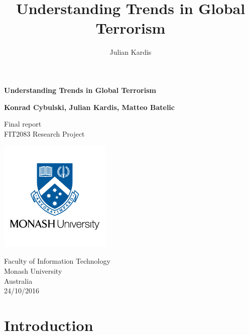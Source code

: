 \documentclass[10pt,a4paper]{article}
\author{Julian Kardis}
\title{Understanding Trends in Global Terrorism}
\begin{document}
\begin{titlepage}
    \begin{center}
        \vspace*{1cm}
        
        \LARGE
        \textbf{Understanding Trends in Global Terrorism}
        
        \vspace{4cm}
        
		\Large 
        
        \textbf{Konrad Cybulski, Julian Kardis, Matteo Batelic}
        
        
        \LARGE
        \vspace{2cm}

        
        
        \vfill
        
        
        
        Final report \\
        FIT2083 Research Project
        
        
        \includegraphics[width=0.4\textwidth]{monash-university-logo.png}
              
        
        \large
        Faculty of Information Technology\\
        Monash University\\
        Australia\\
        24/10/2016
        
    \end{center}
\end{titlepage}

\pagebreak
\tableofcontents
\pagebreak


\section{Introduction} 
\end{document}
